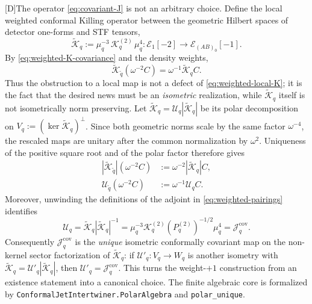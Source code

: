 \documentclass[11pt,a4paper]{article}
\newcommand{\statusD}{\textsf{[D]}}
\begin{document}
\statusD The operator \eqref{eq:covariant-J} is not an arbitrary choice.  Define the local weighted conformal Killing operator between the geometric Hilbert spaces of detector one-forms and STF tensors,
\begin{equation}\label{eq:weighted-local-K}
  \widetilde{\mathcal K}_q
  :=
  \mu_q^{-3}\,\mathcal K_q^{(2)}\,\mu_q^4 :
  \mathcal E_1[-2]\longrightarrow \mathcal E_{(AB)_0}[-1] .
\end{equation}
By \eqref{eq:weighted-K-covariance} and the density weights,
\begin{equation}\label{eq:weighted-local-K-covariance}
  \widetilde{\mathcal K}_{\tilde q}(\omega^{-2}C)
  =
  \omega^{-1}\widetilde{\mathcal K}_qC .
\end{equation}
Thus the obstruction to a local map is not a defect of \eqref{eq:weighted-local-K}; it is the fact that the desired news must be an \emph{isometric} realization, while \(\widetilde{\mathcal K}_q\) itself is not isometrically norm preserving.  Let \(\widetilde{\mathcal K}_q=\mathcal U_q|\widetilde{\mathcal K}_q|\) be its polar decomposition on
\(V_q:=(\ker\widetilde{\mathcal K}_q)^\perp\).  Since both geometric norms scale by the same factor \(\omega^{-4}\), the rescaled maps are unitary after the common normalization by \(\omega^2\).  Uniqueness of the positive square root and of the polar factor therefore gives
\begin{align}
  |\widetilde{\mathcal K}_{\tilde q}|(\omega^{-2}C)
  &:=
  \omega^{-2}|\widetilde{\mathcal K}_q|C ,\\
  \mathcal U_{\tilde q}(\omega^{-2}C)
  &:=
  \omega^{-1}\mathcal U_qC .
\end{align}
Moreover, unwinding the definitions of the adjoint in \eqref{eq:weighted-pairings} identifies
\begin{equation}\label{eq:polar-factor-J}
  \mathcal U_q
  =
  \widetilde{\mathcal K}_q|\widetilde{\mathcal K}_q|^{-1}
  =
  \mu_q^{-3}\mathcal K_q^{(2)}
  (P_q^{(2)})^{-1/2}\mu_q^4
  =
  \mathcal J_q^{\mathrm{cov}} .
\end{equation}
Consequently \(\mathcal J_q^{\mathrm{cov}}\) is the \emph{unique} isometric conformally covariant map on the non-kernel sector factorization of \(\widetilde{\mathcal K}_q\): if \(\mathcal U'_q:V_q\to W_q\) is another isometry with \(\widetilde{\mathcal K}_q=\mathcal U'_q|\widetilde{\mathcal K}_q|\), then \(\mathcal U'_q=\mathcal J_q^{\mathrm{cov}}\).  This turns the weight-\(+1\) construction from an existence statement into a canonical choice.  The finite algebraic core is formalized by \texttt{ConformalJetIntertwiner.PolarAlgebra} and \texttt{polar\_unique}.
\end{document}
